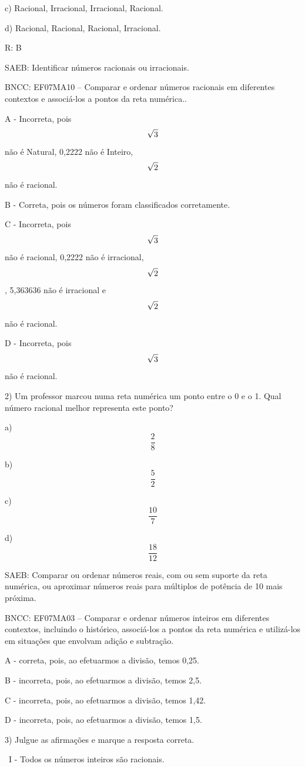 c) Racional, Irracional, Irracional, Racional.

d) Racional, Racional, Racional, Irracional.

R: B

SAEB: Identificar números racionais ou irracionais.

BNCC: EF07MA10 -- Comparar e ordenar números racionais em diferentes
contextos e associá-los a pontos da reta numérica..

A - Incorreta, pois \[\sqrt{3}\\\] não é Natural, 0,2222 não é Inteiro,
\[\sqrt{2}\\\] não é racional.

B - Correta, pois os números foram classificados corretamente.

C - Incorreta, pois \[\sqrt{3}\\\] não é racional, 0,2222 não é
irracional, \[\sqrt{2}\\\] , 5,363636 não é irracional e \[\sqrt{2}\\\]
não é racional.

D - Incorreta, pois \[\sqrt{3}\\\] não é racional.

2) Um professor marcou numa reta numérica um ponto entre o 0 e o 1. Qual
número racional melhor representa este ponto?

a) \[\frac{2}{8}\]

b) \[\frac{5}{2}\]

c) \[\frac{10}{7}\]

d) \[\frac{18}{12}\]

SAEB: Comparar ou ordenar números reais, com ou sem suporte da reta
numérica, ou aproximar números reais para múltiplos de potência de 10
mais próxima.

BNCC: EF07MA03 -- Comparar e ordenar números inteiros em diferentes
contextos, incluindo o histórico, associá-los a pontos da reta numérica
e utilizá-los em situações que envolvam adição e subtração.

A - correta, pois, ao efetuarmos a divisão, temos 0,25.

B - incorreta, pois, ao efetuarmos a divisão, temos 2,5.

C - incorreta, pois, ao efetuarmos a divisão, temos 1,42.

D - incorreta, pois, ao efetuarmos a divisão, temos 1,5.

3) Julgue as afirmações e marque a resposta correta.

~I - Todos os números inteiros são racionais.

